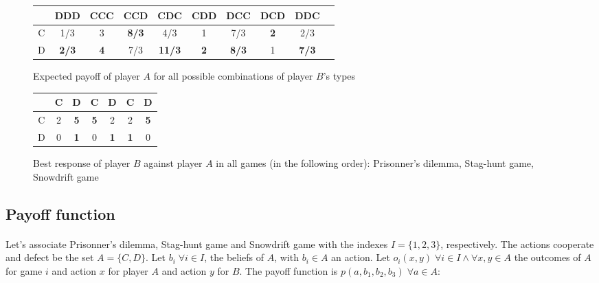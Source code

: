 \documentclass[letterpaper]{article}
\begin{document}
\begin{figure}[!ht]

\begin{center}
\begin{tabular}{|c|c|c|c|c|c|c|c|c|c|}
    \hline
    & DDD & CCC & CCD & CDC & CDD & DCC & DCD & DDC \\
    \hline
    C & 1/3 & 3 & \textbf{8/3} & 4/3 & 1 & 7/3 & \textbf{\color{red}2} & 2/3 \\
    \hline
    D & \textbf{2/3} & \textbf{4} & 7/3 & \textbf{11/3}
    & \textbf{2} & \textbf{8/3} & 1 & \textbf{\color{red}7/3} \\
    \hline
\end{tabular}
\end{center}

\caption{Expected payoff of player $A$ for all possible combinations of
player $B$’s types}
\label{fig:brA}
\end{figure}

\begin{figure}[!ht]

\begin{center}
\begin{tabular}{|c|c|c||c|c||c|c|}
    \hline
    & C & D & C & D & C & D \\
    \hline
    C & 2 & \textbf{5} & \textbf{5}
    & 2 & 2 & \textbf{5} \\
    \hline
    D & 0 & \textbf{1} & 0 & \textbf{1}
    & \textbf{1} & 0 \\
    \hline
\end{tabular}
\end{center}

\caption{Best response of player $B$ against player $A$ in all games
 (in the following order): Prisonner's dilemma, Stag-hunt game, Snowdrift game}
\label{fig:brB}
\end{figure}


\subsection{Payoff function}

\paragraph{}

Let's associate Prisonner's dilemma, Stag-hunt game and Snowdrift game with
the indexes $I = \{1, 2, 3\}$, respectively. The actions
cooperate and defect be the set $A = \{C, D\}$. Let $b_i \; \forall i \in I$,
the beliefs of $A$, with $b_i \in A$ an action.
Let $o_i(x, y) \; \forall i \in I \wedge
\forall x,y \in A$ the outcomes of $A$ for game $i$ and action $x$ for
player $A$ and action $y$ for $B$. The
payoff function is $p(a, b_1, b_2, b_3) \; \forall a \in A$:
\end{document}
